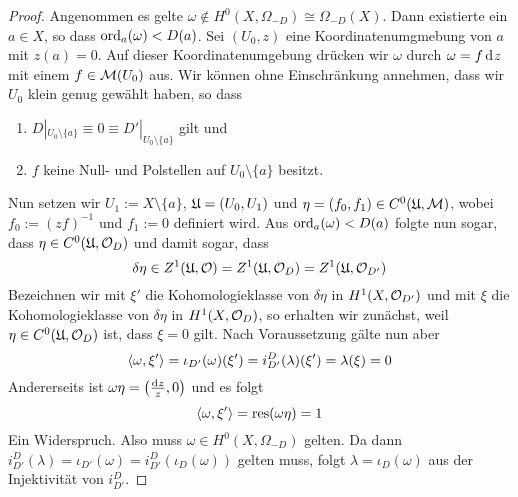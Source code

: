 \begin{proof}
  Angenommen es gelte $\omega \notin H^0(X, \Omega_{-D}) \cong
  \Omega_{-D}(X)$. Dann existierte ein $a \in X$, so dass
  $\operatorname{ord}_a(\omega) < D(a)$. Sei $(U_0, z)$ eine Koordinatenumgmebung
  von $a$ mit $z(a) = 0$. Auf dieser Koordinatenumgebung drücken wir
  $\omega$ durch $\omega = f \d[z]$ mit einem $f \in \mathcal{M}(U_0)$
  aus. Wir können ohne Einschränkung annehmen, dass wir $U_0$ klein
  genug gewählt haben, so dass
  \begin{enumerate}
  \item $D|_{U_0 \setminus \{a\}} \equiv 0 \equiv D'|_{U_0 \setminus
      \{a\}}$ gilt und
  \item $f$ keine Null- und Polstellen auf $U_0 \setminus \{a\}$ besitzt.
  \end{enumerate}
  Nun setzen wir $U_1 := X \setminus \{a\}$, $\mathfrak{U} = (U_0, U_1)$ und
  $\eta = (f_0, f_1) \in C^0(\mathfrak{U}, \mathcal{M})$, wobei $f_0 := (zf)^{-1}$ und
  $f_1 := 0$ definiert wird. Aus $\operatorname{ord}_a(\omega) < D(a)$ folgte nun
  sogar, dass $\eta \in C^0(\mathfrak{U}, \mathcal{O}_D)$ und damit sogar, dass
  \[
  \delta \eta \in Z^1(\mathfrak{U}, \mathcal{O}) = Z^1(\mathfrak{U}, \mathcal{O}_D) = Z^1(\mathfrak{U},
  \mathcal{O}_{D'})
  \]
  Bezeichnen wir mit $\xi'$ die
  Kohomologieklasse von $\delta \eta$ in $H^1(X, \mathcal{O}_{D'})$ und mit
  $\xi$ die Kohomologieklasse von $\delta \eta$ in $H^1(X, \mathcal{O}_D)$,
  so erhalten wir zunächst, weil $\eta \in C^0(\mathfrak{U}, \mathcal{O}_D)$ ist, dass
  $\xi = 0$ gilt. Nach Voraussetzung gälte nun aber
  \[
  \langle \omega, \xi' \rangle = \iota_{D'}(\omega)(\xi') =
  i_{D'}^D(\lambda)(\xi') = \lambda(\xi) = 0
  \]
  Andererseits ist $\omega \eta = \left ( \frac{\d[z]}{z}, 0 \right )$
  und es folgt
  \[
  \langle \omega, \xi' \rangle = \operatorname{res}(\omega \eta) = 1
  \]
  Ein Widerspruch. Also muss $\omega \in H^0(X, \Omega_{-D})$
  gelten. Da dann $i_{D'}^D(\lambda) = \iota_{D'}(\omega) =
  i_{D'}^D(\iota_D(\omega))$ gelten muss, folgt $\lambda =
  \iota_D(\omega)$ aus der Injektivität von $i_{D'}^D$.
\end{proof}

